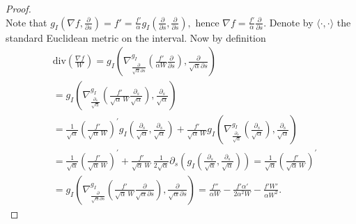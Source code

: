\documentclass[12pt]{article}
\newcommand{\Miguel}[1]{\textcolor{miguel}{#1}}
\numberwithin{lemma}{section}
\newcommand{\produ}[1]{\langle #1\rangle}
\begin{document}
{\begin{proof}
\\
Note that $g_I(\nabla f,\frac{\partial}{\partial s})=f'=\frac{f'}{\alpha}g_I(\frac{\partial}{\partial s},\frac{\partial}{\partial s}),$ hence $\nabla f=\frac{f'}{\alpha}\frac{\partial}{\partial s}$. Denote by $\langle\cdot,\cdot\rangle$ the standard Euclidean metric on the interval. Now by definition 
\begin{align*}
& \textrm{div}\left(\frac{\nabla f}{W}\right) = g_I\left(\nabla^{g_I}_{\frac{\partial}{\sqrt{\alpha}\partial s}}\left(\frac{f'}{\alpha W}\frac{\partial}{\partial s}\right),\frac{\partial}{\sqrt{\alpha}\partial s}\right)  \\
&= g_I\left(\nabla^{g_I}_{\frac{\partial_s}{\sqrt{\alpha}}}\left(\frac{f'}{\sqrt{\alpha}\, W}\frac{\partial_s}{\sqrt{\alpha}}\right),\frac{\partial_s}{\sqrt{\alpha}}\right)\\
& = \frac{1}{\sqrt{\alpha}}\left( \frac{f'}{\sqrt{\alpha}\, W}  \right)^{\prime} 
 g_I\left({\frac{\partial_s}{\sqrt{\alpha}}},\frac{\partial_s}{\sqrt{\alpha}}\right)
+ \frac{f'}{\sqrt{\alpha}\,W} 
g_I\left( \nabla^{g_I}_{\frac{\partial_s}{\sqrt{\alpha}}}\left(\frac{\partial_s}{\sqrt{\alpha}}\right),
\frac{\partial_s}{\sqrt{\alpha}}\right) \\
& =  \frac{1}{\sqrt{\alpha}}\left( \frac{f'}{\sqrt{\alpha}\, W}  \right)^{\prime}  + 
 \frac{f'}{\sqrt{\alpha}\,W} \, \frac{1}{2\sqrt{\alpha}} \partial_s \left( g_I\left(\frac{\partial_s}{\sqrt{\alpha}},
\frac{\partial_s}{\sqrt{\alpha}}\right)\right) 
 =  \frac{1}{\sqrt{\alpha}}\left( \frac{f'}{\sqrt{\alpha}\, W}  \right)^{\prime}   \\
& =
 g_I\left(\nabla^{g_I}_{\frac{\partial}{\sqrt{\alpha}\partial s}}\left(\frac{f'}{\sqrt{\alpha}\, W}\frac{\partial}{\sqrt{\alpha}\partial s}\right),\frac{\partial}{\sqrt{\alpha}\partial s}\right)
= \frac{f''}{\alpha W} - \frac{f'\alpha'}{2 \alpha^2 W} - \frac{f'W'}{\alpha W^2}.
\end{align*}
\end{proof}


}
\end{document}
